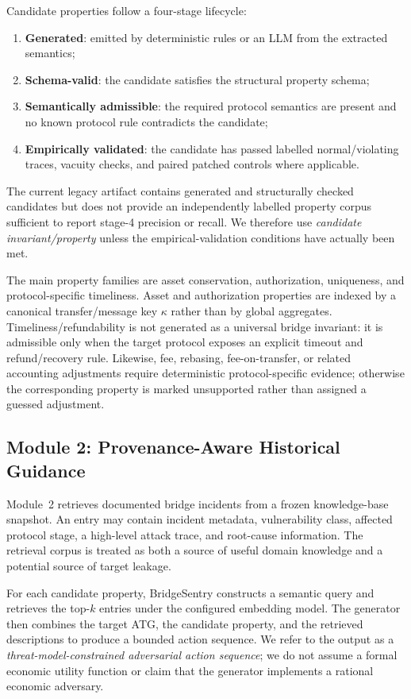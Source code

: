 Candidate properties follow a four-stage lifecycle:
\begin{enumerate}
    \item \textbf{Generated}: emitted by deterministic rules or an LLM from the extracted semantics;
    \item \textbf{Schema-valid}: the candidate satisfies the structural property schema;
    \item \textbf{Semantically admissible}: the required protocol semantics are present and no known protocol rule contradicts the candidate;
    \item \textbf{Empirically validated}: the candidate has passed labelled normal/violating traces, vacuity checks, and paired patched controls where applicable.
\end{enumerate}
The current legacy artifact contains generated and structurally checked candidates but does not provide an independently labelled property corpus sufficient to report stage-4 precision or recall. We therefore use \emph{candidate invariant/property} unless the empirical-validation conditions have actually been met.

The main property families are asset conservation, authorization, uniqueness, and protocol-specific timeliness. Asset and authorization properties are indexed by a canonical transfer/message key $\kappa$ rather than by global aggregates. Timeliness/refundability is not generated as a universal bridge invariant: it is admissible only when the target protocol exposes an explicit timeout and refund/recovery rule. Likewise, fee, rebasing, fee-on-transfer, or related accounting adjustments require deterministic protocol-specific evidence; otherwise the corresponding property is marked unsupported rather than assigned a guessed adjustment.

\subsection{Module 2: Provenance-Aware Historical Guidance}

Module~2 retrieves documented bridge incidents from a frozen knowledge-base snapshot. An entry may contain incident metadata, vulnerability class, affected protocol stage, a high-level attack trace, and root-cause information. The retrieval corpus is treated as both a source of useful domain knowledge and a potential source of target leakage.

For each candidate property, BridgeSentry constructs a semantic query and retrieves the top-$k$ entries under the configured embedding model. The generator then combines the target ATG, the candidate property, and the retrieved descriptions to produce a bounded action sequence. We refer to the output as a \emph{threat-model-constrained adversarial action sequence}; we do not assume a formal economic utility function or claim that the generator implements a rational economic adversary.

